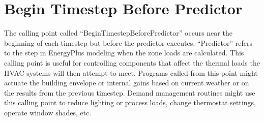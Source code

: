 \section{Begin Timestep Before Predictor}\label{begin-timestep-before-predictor}

The calling point called ``BeginTimestepBeforePredictor'' occurs near the beginning of each timestep but before the predictor executes. ``Predictor'' refers to the step in EnergyPlus modeling when the zone loads are calculated. This calling point is useful for controlling components that affect the thermal loads the HVAC systems will then attempt to meet. Programs called from this point might actuate the building envelope or internal gains based on current weather or on the results from the previous timestep. Demand management routines might use this calling point to reduce lighting or process loads, change thermostat settings, operate window shades, etc.
